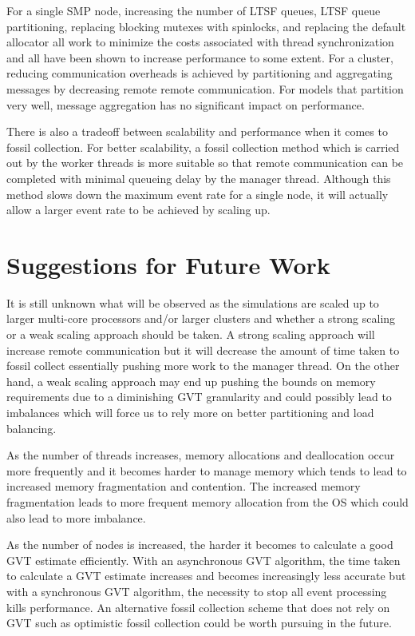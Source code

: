 \documentclass[11pt]{book}
\begin{document}
For a single SMP node, increasing the number of LTSF queues, LTSF queue partitioning, replacing
blocking mutexes with spinlocks, and replacing the default allocator all work to minimize the costs
associated with thread synchronization and all have been shown to increase performance to some
extent.  For a cluster, reducing communication overheads is achieved by partitioning and aggregating
messages by decreasing remote remote communication.  For models that partition very well, message
aggregation has no significant impact on performance.

There is also a tradeoff between scalability and performance when it comes to fossil collection.
For better scalability, a fossil collection method which is carried out by the worker threads is
more suitable so that remote communication can be completed with minimal queueing delay by the
manager thread.  Although this method slows down the maximum event rate for a single node, it will
actually allow a larger event rate to be achieved by scaling up.

\section{Suggestions for Future Work}

It is still unknown what will be observed as the simulations are scaled up to larger multi-core
processors and/or larger clusters and whether a strong scaling or a weak scaling approach should be
taken.  A strong scaling approach will increase remote communication but it will decrease the amount
of time taken to fossil collect essentially pushing more work to the manager thread.  On the other
hand, a weak scaling approach may end up pushing the bounds on memory requirements due to a
diminishing GVT granularity and could possibly lead to imbalances which will force us to rely more
on better partitioning and load balancing.

As the number of threads increases, memory allocations and deallocation occur more frequently and it
becomes harder to manage memory which tends to lead to increased memory fragmentation and
contention.  The increased memory fragmentation leads to more frequent memory allocation from the OS
which could also lead to more imbalance.

As the number of nodes is increased, the harder it becomes to calculate a good GVT estimate
efficiently.  With an asynchronous GVT algorithm, the time taken to calculate a GVT estimate
increases and becomes increasingly less accurate but with a synchronous GVT algorithm, the necessity
to stop all event processing kills performance.  An alternative fossil collection scheme that does
not rely on GVT such as optimistic fossil collection could be worth pursuing in the future.
\end{document}
